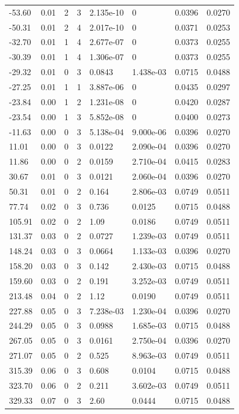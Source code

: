 \documentclass[preview]{standalone}
\begin{document}
{{\begin{tabular}{L{1.2cm}C{1.2cm} C{0.3cm}C{0.5cm} C{1.4cm}C{1.4cm} C{1.4cm}C{1.4cm}}
  -53.60  &  0.01  & 2     &  3 &  2.135e-10  & 0  & 0.0396 &  0.0270   \\ 
  -50.31  &  0.01  & 2     &  4 &  2.017e-10  & 0  & 0.0371 &  0.0253   \\ 
  -32.70  &  0.01  & 1     &  4 &  2.677e-07  & 0  & 0.0373 &  0.0255   \\ 
  -30.39  &  0.01  & 1     &  4 &  1.306e-07  & 0  & 0.0373 &  0.0255   \\ 
  -29.32  &  0.01  & 0     &  3 &  0.0843  & 1.438e-03  & 0.0715 &  0.0488   \\ 
  -27.25  &  0.01  & 1     &  1 &  3.887e-06  & 0  & 0.0435 &  0.0297   \\ 
  -23.84  &  0.00  & 1     &  2 &  1.231e-08  & 0  & 0.0420 &  0.0287   \\ 
  -23.54  &  0.00  & 1     &  3 &  5.852e-08  & 0  & 0.0400 &  0.0273   \\ 
  -11.63  &  0.00  & 0     &  3 &  5.138e-04  & 9.000e-06  & 0.0396 &  0.0270   \\ 
  11.01  &  0.00  & 0     &  3 &  0.0122  & 2.090e-04  & 0.0396 &  0.0270   \\ 
  11.86  &  0.00  & 0     &  2 &  0.0159  & 2.710e-04  & 0.0415 &  0.0283   \\ 
  30.67  &  0.01  & 0     &  3 &  0.0121  & 2.060e-04  & 0.0396 &  0.0270   \\ 
  50.31  &  0.01  & 0     &  2 &  0.164  & 2.806e-03  & 0.0749 &  0.0511   \\ 
  77.74  &  0.02  & 0     &  3 &  0.736  & 0.0125  & 0.0715 &  0.0488   \\ 
  105.91  &  0.02  & 0     &  2 &  1.09  & 0.0186  & 0.0749 &  0.0511   \\ 
  131.37  &  0.03  & 0     &  2 &  0.0727  & 1.239e-03  & 0.0749 &  0.0511   \\ 
  148.24  &  0.03  & 0     &  3 &  0.0664  & 1.133e-03  & 0.0396 &  0.0270   \\ 
  158.20  &  0.03  & 0     &  3 &  0.142  & 2.430e-03  & 0.0715 &  0.0488   \\ 
  159.60  &  0.03  & 0     &  2 &  0.191  & 3.252e-03  & 0.0749 &  0.0511   \\ 
  213.48  &  0.04  & 0     &  2 &  1.12  & 0.0190  & 0.0749 &  0.0511   \\ 
  227.88  &  0.05  & 0     &  3 &  7.238e-03  & 1.230e-04  & 0.0396 &  0.0270   \\ 
  244.29  &  0.05  & 0     &  3 &  0.0988  & 1.685e-03  & 0.0715 &  0.0488   \\ 
  267.05  &  0.05  & 0     &  3 &  0.0161  & 2.750e-04  & 0.0396 &  0.0270   \\ 
  271.07  &  0.05  & 0     &  2 &  0.525  & 8.963e-03  & 0.0749 &  0.0511   \\ 
  315.39  &  0.06  & 0     &  3 &  0.608  & 0.0104  & 0.0715 &  0.0488   \\ 
  323.70  &  0.06  & 0     &  2 &  0.211  & 3.602e-03  & 0.0749 &  0.0511   \\ 
  329.33  &  0.07  & 0     &  3 &  2.60  & 0.0444  & 0.0715 &  0.0488   \\ 
\hline 
\end{tabular} 

}}
\end{document}

